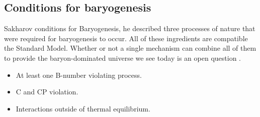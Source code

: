 \subsection{Conditions for baryogenesis}
Sakharov conditions for Baryogenesis\cite{5}, he described three processes of nature that were required for baryogenesis to occur. All of these ingredients are compatible the Standard Model. Whether or not a single mechanism can combine all of them to provide the baryon-dominated universe we see today is an open question \cite{5}.
\begin{itemize}
\item At least one B-number violating process.
\item C and CP violation.
\item Interactions outside of thermal equilibrium.
\end{itemize}
